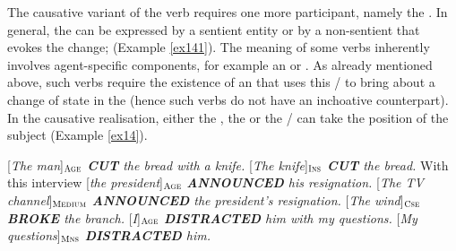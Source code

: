 \documentclass[output=paper,colorlinks,citecolor=brown]{langscibook}
\begin{document}
The causative variant of the verb requires one more participant, namely the .  In general, the  can be expressed by a sentient entity or by a non-sentient  that evokes the change;  (Example \ref{ex141}). The meaning of some verbs inherently involves agent-specific components, for example an  or . As already mentioned above, such verbs require the existence of an  that uses this \slash {} to bring about a change of state in the  (hence such verbs do not have an inchoative counterpart). In the causative realisation, either the , the  or the \slash {} can take the position of the subject (Example \ref{ex14}).

 
\begin{exe}
 \ex \label{ex14}
       \begin{xlist}
         \ex \label{ex14a}{[}\textit{The man}{]}$_{\text{\textsc{Age}}}$ \textit{\textbf{CUT} the bread with a knife.}
         \ex\label{ex14b} {[}\textit{The knife}{]}$_{\text{\textsc{Ins}}}$ \textit{\textbf{CUT} the bread.}
\ex \label{ex14c}With this interview {[}\textit{the president}{]}$_{\text{\textsc{Age}}}$ \textit{\textbf{ANNOUNCED} his resignation.}
\ex\label{ex14d}{[}\textit{The TV channel}{]}$_{\text{\textsc{Medium}}}$ \textit{\textbf{ANNOUNCED} the president's resignation.}
\ex\label{ex14e}{[}\textit{The wind}{]}$_{\text{\textsc{Cse}}}$ \textit{\textbf{BROKE} the branch.}
\ex\label{ex14f}{[}\textit{I}{]}$_{\text{\textsc{Age}}}$ \textit{\textbf{DISTRACTED} him with my questions.}
\ex\label{ex14g}{[}\textit{My questions}{]}$_{\text{\textsc{Mns}}}$ \textit{\textbf{DISTRACTED} him.}
     \end{xlist}
\end{exe}
\end{document}
